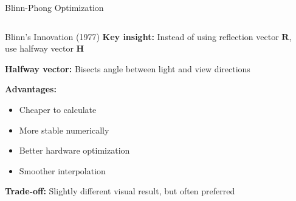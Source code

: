 \begin{frame}{Blinn-Phong Optimization}
  \begin{columns}
    \begin{column}{0.5\textwidth}
      \begin{raybox}{Blinn's Innovation (1977)}
        \textbf{Key insight:} Instead of using reflection vector $\mathbf{R}$, use halfway vector $\mathbf{H}$

        \vspace{0.3cm}
        \textbf{Halfway vector:} Bisects angle between light and view directions

        \vspace{0.3cm}
        \textbf{Advantages:}
        \begin{itemize}
          \item Cheaper to calculate
          \item More stable numerically
          \item Better hardware optimization
          \item Smoother interpolation
        \end{itemize}

        \vspace{0.3cm}
        \textbf{Trade-off:} Slightly different visual result, but often preferred
      \end{raybox}
    \end{column}
    \begin{column}{0.5\textwidth}
\end{column}
\end{columns}
\end{frame}
